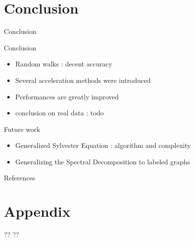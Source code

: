 \documentclass[compress]{beamer}
\begin{document}
\section{Conclusion}
\begin{frame}{Conclusion}
\begin{block}{Conclusion}
	\begin{itemize}
		\item Random walks : decent accuracy
		\item Several acceleration methods were introduced
		\item Performances are greatly improved
		\item conclusion on real data : todo
	\end{itemize}
\end{block}
\begin{block}{Future work}
	\begin{itemize}
		\item Generalized Sylvester Equation : algorithm and complexity
		\item Generalizing the Spectral Decomposition to labeled graphs
	\end{itemize}
\end{block}
\end{frame}

\renewcommand\bibsection{\subsection{\refname}}
\begin{frame}{References}
\nocite{bondy1976graph,borgwardt_protein_2005,imrich2000product,burges_tutorial_1998,vapnik_statistical_1998,nesterov_lectures_2018,shervashidze_efficient_2009}

\footnotesize

\end{frame}

\appendix
\section[]{Appendix}
\begin{frame}[plain]{??}
??
\end{frame}
\end{document}
